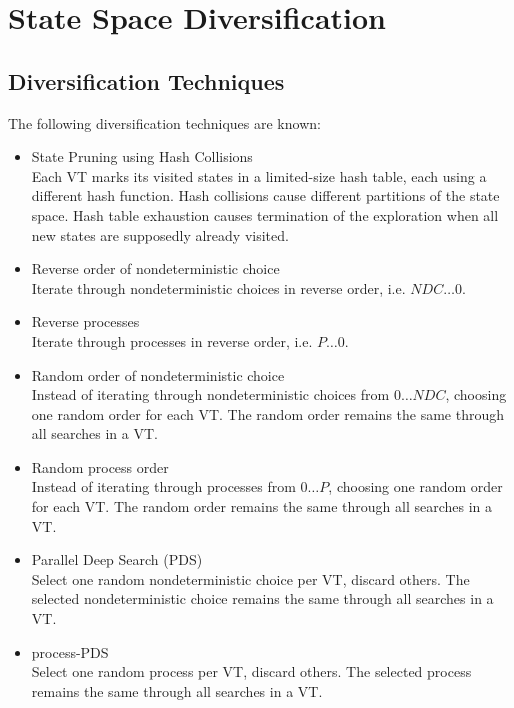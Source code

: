 \documentclass[
fancyheadings, %
%
%
]{stsreprt}
\begin{document}
\section{State Space Diversification}
\label{section:theory:state-space-diversification}


\subsection{Diversification Techniques}

The following diversification techniques are known: \cite{Holzmann2011.Swarm-Verification-Techniques,DeFrancisco2020.Grapple}

\begin{itemize}
    \item \textsf{State Pruning using Hash Collisions} \\
          Each VT marks its visited states in a limited-size hash table, each using a different hash function.
          Hash collisions cause different partitions of the state space.
          Hash table exhaustion causes termination of the exploration when all new states are supposedly already visited.
    \item \textsf{Reverse order of nondeterministic choice} \\
          Iterate through nondeterministic choices in reverse order, i.e. $\mathit{NDC}{\dots}0$.
    \item \textsf{Reverse processes} \\
          Iterate through processes in reverse order, i.e. $P{\dots}0$.
    \item \textsf{Random order of nondeterministic choice} \\
          Instead of iterating through nondeterministic choices from $0{\dots}\mathit{NDC}$, choosing one random order for each VT.
          The random order remains the same through all searches in a VT.
    \item \textsf{Random process order} \\
          Instead of iterating through processes from $0{\dots}P$, choosing one random order for each VT.
          The random order remains the same through all searches in a VT.
    \item \textsf{Parallel Deep Search (PDS)} \\
          Select one random nondeterministic choice per VT, discard others.
          The selected nondeterministic choice remains the same through all searches in a VT.
    \item \textsf{process-PDS} \\
          Select one random process per VT, discard others.
          The selected process remains the same through all searches in a VT.
\end{itemize}
\end{document}
